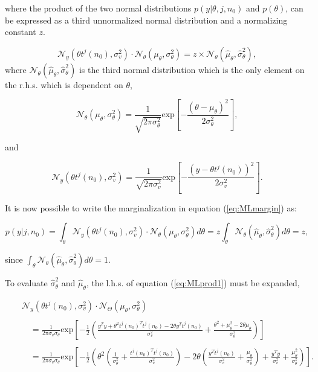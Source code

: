 where the product of the two normal distributions $p(y|\theta, j, n_0)$ and $p(\theta)$, can be expressed as a third unnormalized normal distribution and a normalizing constant $z$.

\begin{equation}\label{eq:MLprod1}
\mathcal{N}_y(\theta t^j(n_0),\sigma_v^2)\cdot\mathcal{N}_\theta(\mu_\theta,\sigma^2_\theta) = z \times \mathcal{N}_\theta(\hat{\mu}_\theta,\hat{\sigma}^2_\theta),
\end{equation}
where $\mathcal{N}_\theta(\hat{\mu}_\theta,\hat{\sigma}_\theta^2)$ is the third normal distribution which is the only element on the r.h.s. which is dependent on $\theta$,

\begin{equation}\label{eq:MLtheta2}
\mathcal{N}_\theta(\mu_\theta,\sigma^2_\theta) = \frac{1}{\sqrt{2 \pi \sigma_\theta^2}} \textrm{exp}\left[-\frac{\left(\theta - \mu_\theta\right)^2}{2\sigma_\theta^2}\right],
\end{equation}

and

\begin{equation}\label{eq:MLnoise2}
\mathcal{N}_y(\theta t^j(n_0),\sigma_v^2) = \frac{1}{\sqrt{2 \pi \sigma_v^2}} \textrm{exp}\left[-\frac{\left(y - \theta t^j\left(n_0\right)\right)^2}{2\sigma_v^2}\right].
\end{equation}

It is now possible to write the marginalization in equation (\ref{eq:MLmargin}) as:

\begin{equation}\label{eq:MLmargin2}
p(y|j,n_0)=\int_\theta \mathcal{N}_y(\theta t^j(n_0),\sigma_v^2)\cdot\mathcal{N}_\theta(\mu_\theta,\sigma^2_\theta) d\theta = z \int_\theta \mathcal{N}_\theta(\hat{\mu}_\theta,\hat{\sigma}^2_\theta) d\theta = z,
\end{equation}

since $\int_\theta \mathcal{N}_\theta(\hat{\mu}_\theta,\hat{\sigma}^2_\theta) d\theta = 1$.

To evaluate $\hat{\sigma}^2_\theta$ and $\hat{\mu}_\theta$, the l.h.s. of equation (\ref{eq:MLprod1}) must be expanded,

\begin{eqnarray}\label{eq:MLprod3}
& & \mathcal{N}_y(\theta t^j(n_0),\sigma_v^2)\cdot\mathcal{N}_\Theta(\mu_\theta,\sigma^2_\theta) \\\nonumber{}\\\nonumber
& & \quad = \frac{1}{2\pi \sigma_v \sigma_\theta} \textrm{exp}\left[-\frac{1}{2}\left(\frac{y^Ty +\theta^2t^j(n_0)^Tt^j(n_0)-2\theta y^T t^j(n_0)}{\sigma^2_v}+\frac{\theta^2 + \mu^2_\theta-2\theta\mu_\theta}{\sigma_\theta^2}\right)\right]\\\nonumber{}\\\nonumber
& & \quad = \frac{1}{2\pi \sigma_v \sigma_\theta} \textrm{exp}\left[-\frac{1}{2}\left(\theta^2 \left(\frac{1}{\sigma_\theta^2}+\frac{t^j(n_0)^T t^j(n_0)}{\sigma_v^2}\right) - 2\theta\left(\frac{y^T t^j(n_0)}{\sigma_v^2}+\frac{\mu_\theta}{\sigma_\theta^2}\right) + \frac{y^Ty}{\sigma_v^2} +\frac{\mu_\theta^2}{\sigma_\theta^2}\right)\right].
\end{eqnarray}

